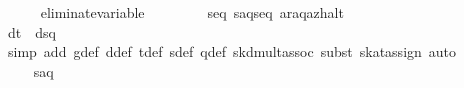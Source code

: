 \begin{isabellebody}
\ \ \ \ \isamarkupfalse%
\ {}eliminate{}variable\ {}{}\isanewline
\isanewline
\ \ \isamarkupfalse%
\ \isamarkupfalse%
\ {}{}{}{}\ {}\ seq\ {}s{}{}a{}{}q{}{}{}{}{}seq\ {}{}a{}{}r{}{}{}a{}{}q{}{}{}{}{}a{}{}z{}{}halt{}{}\isanewline
\ \ \isamarkupfalse%
\ {}\isanewline
\ \ \ \ \isamarkupfalse%
\isanewline
\ \ \ \ \ \ \isamarkupfalse%
\ {}d{}t{}\ {}\ d{}s{}{}q{}{}{}{}\isanewline
\ \ \ \ \ \ \ \ \isamarkupfalse%
\ {}simp\ add{}\ g{}def\ d{}def\ t{}def\ s{}def\ q{}def\ skd{}mult{}assoc{}\ subst\ skat{}assign{}{}\ auto{}\isanewline
\ \ \ \ \ \ \isamarkupfalse%
\ \isamarkupfalse%
\ {}{}{}{}\ {}\ s{}{}a{}{}q{}{}{}{}\isanewline

\end{isabellebody}
